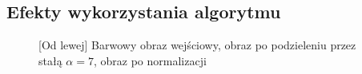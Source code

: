 \documentclass[a4paper,12pt, titlepage]{report}
\begin{document}
\subsection*{Efekty wykorzystania algorytmu}
\begin{figure}[h]
    \centering
    \caption{[Od lewej] Barwowy obraz wejściowy, obraz po podzieleniu przez stałą \(\alpha=7\), obraz po normalizacji}%
    \label{fig:geo_after_grey1}%
\end{figure}
\FloatBarrier
\end{document}
